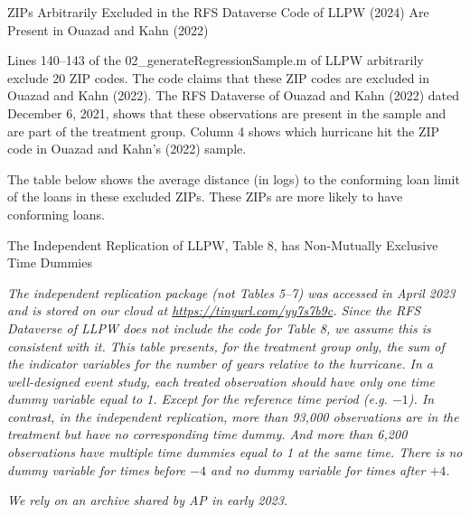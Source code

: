 \documentclass{article}
\begin{document}
\clearpage
\pagebreak

\begin{table}
    
\caption{ZIPs Arbitrarily Excluded in the RFS Dataverse Code of LLPW (2024) Are Present in Ouazad and Kahn (2022)} 

Lines 140--143 of the 02\_generateRegressionSample.m of LLPW arbitrarily exclude 20 ZIP codes. The code claims that these ZIP codes are excluded in Ouazad and Kahn (2022). The RFS Dataverse of Ouazad and Kahn (2022) dated December 6, 2021, shows that these observations are present in the sample and are part of the treatment group. Column 4 shows which hurricane hit the ZIP code in Ouazad and Kahn's (2022) sample.

\bigskip

\begin{center}
    
\end{center}

\bigskip

The table below shows the average distance (in logs) to the conforming loan limit of the loans in these excluded ZIPs. These ZIPs are more likely to have conforming loans.

\bigskip

\begin{center}
    
\end{center}

\end{table}

\clearpage
\pagebreak

\begin{table}
\caption{The Independent Replication of LLPW, Table 8, has Non-Mutually Exclusive Time Dummies}

\emph{The independent replication package (not Tables 5--7) was accessed in April 2023 and is stored on our cloud at \url{https://tinyurl.com/yy7s7b9c}. Since the RFS Dataverse of LLPW does not include the code for Table 8, we assume this is consistent with it. This table presents, for the treatment group only, the sum of the indicator variables for the number of years relative to the hurricane. In a well-designed event study, each treated observation should have only one time dummy variable equal to 1. Except for the reference time period (e.g. $-1$). In contrast, in the independent replication, more than 93,000 observations are in the treatment but have no corresponding time dummy. And more than 6,200 observations have multiple time dummies equal to 1 at the same time. There is no dummy variable for times before $-4$ and no dummy variable for times after $+4$. }

\begin{center}

\end{center}

\emph{We rely on an archive shared by AP in early 2023.}

\end{table}
\end{document}
